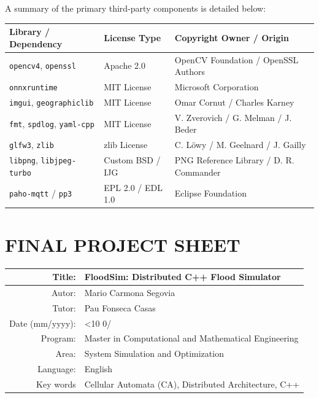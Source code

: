 \noindent A summary of the primary third-party components is detailed below:

\begin{table}[H]
\centering
\small
\begin{tabular}{lll}
\toprule
\textbf{Library / Dependency} & \textbf{License Type} & \textbf{Copyright Owner / Origin} \\ 
\midrule
\texttt{opencv4}, \texttt{openssl} & Apache 2.0 & OpenCV Foundation / OpenSSL Authors \\
\texttt{onnxruntime} & MIT License & Microsoft Corporation \\
\texttt{imgui}, \texttt{geographiclib} & MIT License & Omar Cornut / Charles Karney \\
\texttt{fmt}, \texttt{spdlog}, \texttt{yaml-cpp} & MIT License & V. Zverovich / G. Melman / J. Beder \\
\texttt{glfw3}, \texttt{zlib} & zlib License & C. Löwy / M. Geelnard / J. Gailly \\
\texttt{libpng}, \texttt{libjpeg-turbo} & Custom BSD / IJG & PNG Reference Library / D. R. Commander \\
\texttt{paho-mqtt} / \texttt{pp3} & EPL 2.0 / EDL 1.0 & Eclipse Foundation \\
\bottomrule
\end{tabular}
\end{table}





\chapter*{FINAL PROJECT SHEET}

\newcommand{\mmyyyy}{\ifnum\month<10 0\fi\the\month/\the\year}

\begin{table}[ht]
	\centering{}
	\renewcommand{\arraystretch}{2}
	\begin{tabular}{r | l}
		\hline
		Title: & FloodSim: Distributed C++ Flood Simulator\\
		\hline
        Autor: & Mario Carmona Segovia\\
		\hline
        Tutor: & Pau Fonseca Casas\\
		\hline
        Date (mm/yyyy): & \mmyyyy\\
		\hline
        Program: & Master in Computational and Mathematical Engineering\\
		\hline
        Area: & System Simulation and Optimization\\
		\hline
        Language: & English\\
		\hline
        Key words & Cellular Automata (CA), Distributed Architecture, C++\\
		\hline
	\end{tabular}
\end{table}

